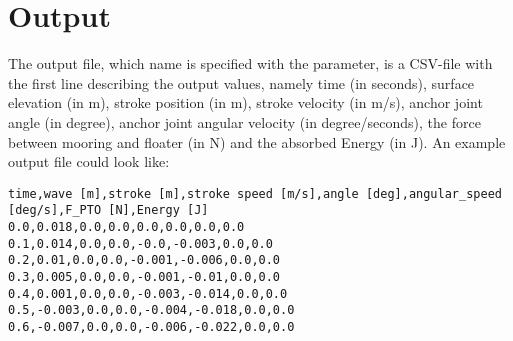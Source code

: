 \documentclass[oneside,10pt,a4paper]{book}
\begin{document}
\section{Output}
The output file, which name is specified with the  parameter, is a CSV-file with the first line describing the output values, namely time (in seconds), surface elevation (in m), stroke position (in m), stroke velocity (in m/s), anchor joint angle (in degree), anchor joint angular velocity (in degree/seconds), the force between mooring and floater (in N) and the absorbed Energy (in J). An example output file could look like:
\begin{verbatim}
time,wave [m],stroke [m],stroke speed [m/s],angle [deg],angular_speed [deg/s],F_PTO [N],Energy [J]
0.0,0.018,0.0,0.0,0.0,0.0,0.0,0.0
0.1,0.014,0.0,0.0,-0.0,-0.003,0.0,0.0
0.2,0.01,0.0,0.0,-0.001,-0.006,0.0,0.0
0.3,0.005,0.0,0.0,-0.001,-0.01,0.0,0.0
0.4,0.001,0.0,0.0,-0.003,-0.014,0.0,0.0
0.5,-0.003,0.0,0.0,-0.004,-0.018,0.0,0.0
0.6,-0.007,0.0,0.0,-0.006,-0.022,0.0,0.0
\end{verbatim}
\end{document}
